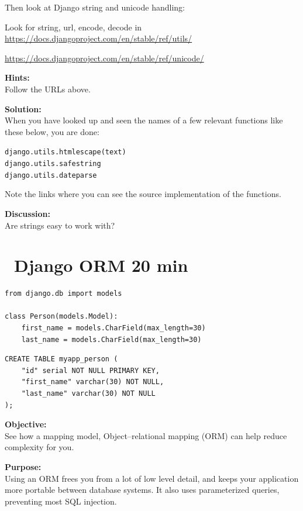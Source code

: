 \documentclass[a4paper,11pt,notitlepage]{report}
\begin{document}
Then look at Django string and unicode handling:
\begin{list2}
\item Look for string, url, encode, decode in\\
\url{https://docs.djangoproject.com/en/stable/ref/utils/}
\item \url{https://docs.djangoproject.com/en/stable/ref/unicode/}
\end{list2}

{\bf Hints:}\\
Follow the URLs above.

{\bf Solution:}\\
When you have looked up and seen the names of a few relevant functions like these below, you are done:

\begin{alltt}
django.utils.html escape(text)
django.utils.safestring
django.utils.dateparse
\end{alltt}

Note the links where you can see the source implementation of the functions.

{\bf Discussion:}\\
Are strings easy to work with?


\chapter{\faInfoCircle\ Django ORM 20 min}
\label{ex:django-orm}

\begin{verbatim}
from django.db import models

class Person(models.Model):
    first_name = models.CharField(max_length=30)
    last_name = models.CharField(max_length=30)
\end{verbatim}

\begin{verbatim}
CREATE TABLE myapp_person (
    "id" serial NOT NULL PRIMARY KEY,
    "first_name" varchar(30) NOT NULL,
    "last_name" varchar(30) NOT NULL
);
\end{verbatim}

{\bf Objective:}\\
See how a mapping model, Object–relational mapping (ORM) can help reduce complexity for you.

{\bf Purpose:}\\
Using an ORM frees you from a lot of low level detail, and keeps your application more portable between database systems. It also uses parameterized queries, preventing most SQL injection.
\end{document}
